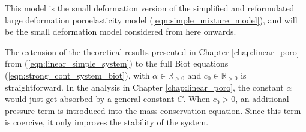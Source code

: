 \noindent This model is the small deformation version of the simplified and reformulated large deformation poroelasticity model (\ref{eqn:simple_mixture_model}), and will be the small deformation model considered from here onwards.


\begin{remark}
The extension of the theoretical results presented in Chapter \ref{chap:linear_poro} from (\ref{eqn:linear_simple_system}) to the full Biot equations (\ref{eqn:strong_cont_system_biot}), with $\alpha \in \mathbb{R}_{> 0} \text{ and } c_{0}\in \mathbb{R}_{> 0}$ is straightforward. In the analysis in Chapter \ref{chap:linear_poro}, the constant $\alpha$ would just get absorbed by a general constant $C$. When $c_{0}>0$, an additional pressure term is introduced into the mass conservation equation. Since this term is coercive, it only improves the stability of the system.
\label{remark:extension}
\end{remark}

